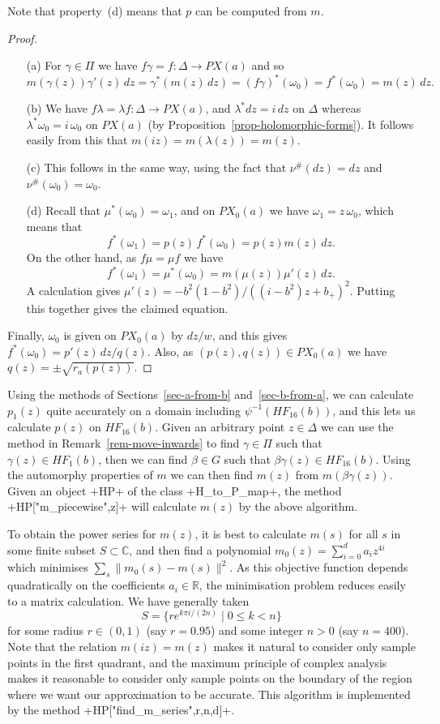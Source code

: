 \documentclass[reqno]{amsart}
\newcommand{\Dl}        {\Delta}
\newcommand{\bt}        {\beta}
\newcommand{\gm}        {\gamma}
\newcommand{\lm}        {\lambda}
\newcommand{\om}        {\omega}
\newcommand{\R}         {{\mathbb{R}}}
\newcommand{\C}         {{\mathbb{C}}}
\newcommand{\st}        {\;|\;}
\renewcommand{\:}{\colon}
\theoremstyle{definition}
\begin{document}
Note that property~(d) means that $p$ can be computed from $m$.

\begin{proof}
 \begin{itemize}
  \item[(a)] For $\gm\in\Pi$ we have $f\gm=f\:\Dl\to PX(a)$ and so
   \[ m(\gm(z))\gm'(z)\,dz = \gm^*(m(z)\,dz) = (f\gm)^*(\om_0) =
       f^*(\om_0) =m(z)\,dz.
   \]
  \item[(b)] We have $f\lm=\lm f\:\Dl\to PX(a)$, and $\lm^*dz=i\,dz$
   on $\Dl$ whereas $\lm^*\om_0=i\,\om_0$ on $PX(a)$ (by
   Proposition~\ref{prop-holomorphic-forms}).  It follows easily from
   this that $m(iz)=m(\lm(z))=m(z)$.
  \item[(c)] This follows in the same way, using the fact that
   $\nu^\#(dz)=dz$ and $\nu^\#(\om_0)=\om_0$.
  \item[(d)] Recall that $\mu^*(\om_0)=\om_1$, and on $PX_0(a)$ we
   have $\om_1=z\,\om_0$, which means that
   \[ f^*(\om_1)=p(z)\,f^*(\om_0)=p(z)m(z)\,dz. \]
   On the other hand, as
   $f\mu=\mu f$ we have
   \[ f^*(\om_1)=\mu^*(\om_0)=m(\mu(z))\mu'(z)\,dz. \]
   A calculation
   gives $\mu'(z)=-b^2(1-b^2)/((i-b^2)z+b_+)^2$.  Putting this
   together gives the claimed equation.
 \end{itemize}

 Finally, $\om_0$ is given on $PX_0(a)$ by $dz/w$, and this gives
 $f^*(\om_0)=p'(z)\,dz/q(z)$.  Also, as $(p(z),q(z))\in PX_0(a)$ we
 have $q(z)=\pm\sqrt{r_a(p(z))}$.
\end{proof}

Using the methods of Sections~\ref{sec-a-from-b}
and~\ref{sec-b-from-a}, we can calculate $p_1(z)$ quite accurately on
a domain including $\psi^{-1}(HF_{16}(b))$, and this lets us calculate
$p(z)$ on $HF_{16}(b)$.  Given an arbitrary point $z\in\Dl$ we can use
the method in Remark~\ref{rem-move-inwards} to find $\gm\in\Pi$ such
that $\gm(z)\in HF_1(b)$, then we can find $\bt\in G$ such that
$\bt\gm(z)\in HF_{16}(b)$.  Using the automorphy properties of $m$ we
can then find $m(z)$ from $m(\bt\gm(z))$.  Given an object \mcode+HP+
of the class \mcode+H_to_P_map+, the method \mcode+HP["m_piecewise",z]+
will calculate $m(z)$ by the above algorithm.

To obtain the power series for $m(z)$, it is best to calculate $m(s)$
for all $s$ in some finite subset $S\subset\C$, and then find a
polynomial $m_0(z)=\sum_{i=0}^da_iz^{4i}$ which minimises
$\sum_s\|m_0(s)-m(s)\|^2$.  As this objective function depends
quadratically on the coefficients $a_i\in\R$, the minimisation problem
reduces easily to a matrix calculation.  We have generally taken
\[ S = \{re^{k\pi i/(2n)}\st 0\leq k<n\} \]
for some radius $r\in(0,1)$ (say $r=0.95$) and some integer $n>0$ (say
$n=400$).  Note that the relation $m(iz)=m(z)$ makes it natural to
consider only sample points in the first quadrant, and the maximum
principle of complex analysis makes it reasonable to consider only
sample points on the boundary of the region where we want our
approximation to be accurate.  This algorithm is implemented by the
method \mcode+HP["find_m_series",r,n,d]+.
\end{document}
